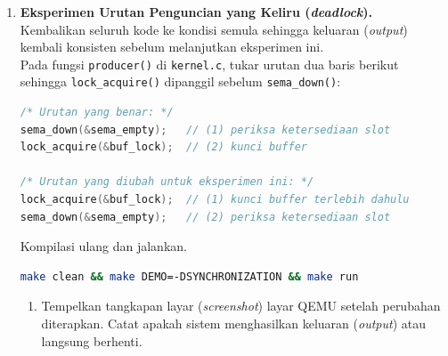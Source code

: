 \begin{enumerate}
\begin{enumerate}


		      \item Apakah keluaran (\textit{output}) masih konsisten? Apa perbedaan yang dapat diamati dibandingkan saat ketiganya aktif? Jelaskan.
	      \end{enumerate}

	\item \textbf{Eksperimen Urutan Penguncian yang Keliru (\textit{deadlock}).}\\
	      Kembalikan seluruh kode ke kondisi semula sehingga keluaran (\textit{output}) kembali konsisten sebelum melanjutkan eksperimen ini.\\[0.2cm]
	      Pada fungsi \texttt{producer()} di \texttt{kernel.c}, tukar urutan dua baris berikut sehingga \texttt{lock\_acquire()} dipanggil sebelum \texttt{sema\_down()}:

	      \begin{lstlisting}[language=C, caption={Perbandingan urutan yang benar dan yang diubah}]
/* Urutan yang benar: */
sema_down(&sema_empty);   // (1) periksa ketersediaan slot
lock_acquire(&buf_lock);  // (2) kunci buffer

/* Urutan yang diubah untuk eksperimen ini: */
lock_acquire(&buf_lock);  // (1) kunci buffer terlebih dahulu
sema_down(&sema_empty);   // (2) periksa ketersediaan slot
    \end{lstlisting}

	      Kompilasi ulang dan jalankan.

	      \begin{lstlisting}[language=bash, caption={Kompilasi untuk eksperimen \textit{deadlock}}]
make clean && make DEMO=-DSYNCHRONIZATION && make run
    \end{lstlisting}

	      \begin{enumerate}
		      \item Tempelkan tangkapan layar (\textit{screenshot}) layar QEMU setelah perubahan diterapkan. Catat apakah sistem menghasilkan keluaran (\textit{output}) atau langsung berhenti.


\end{enumerate}
\end{enumerate}
